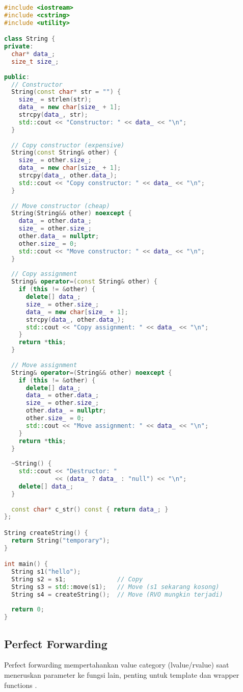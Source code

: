 \documentclass[../main.tex]{subfiles}
\begin{document}
\begin{lstlisting}[language=C++, caption={Implementasi move semantics}]
#include <iostream>
#include <cstring>
#include <utility>

class String {
private:
  char* data_;
  size_t size_;
  
public:
  // Constructor
  String(const char* str = "") {
    size_ = strlen(str);
    data_ = new char[size_ + 1];
    strcpy(data_, str);
    std::cout << "Constructor: " << data_ << "\n";
  }
  
  // Copy constructor (expensive)
  String(const String& other) {
    size_ = other.size_;
    data_ = new char[size_ + 1];
    strcpy(data_, other.data_);
    std::cout << "Copy constructor: " << data_ << "\n";
  }
  
  // Move constructor (cheap)
  String(String&& other) noexcept {
    data_ = other.data_;
    size_ = other.size_;
    other.data_ = nullptr;
    other.size_ = 0;
    std::cout << "Move constructor: " << data_ << "\n";
  }
  
  // Copy assignment
  String& operator=(const String& other) {
    if (this != &other) {
      delete[] data_;
      size_ = other.size_;
      data_ = new char[size_ + 1];
      strcpy(data_, other.data_);
      std::cout << "Copy assignment: " << data_ << "\n";
    }
    return *this;
  }
  
  // Move assignment
  String& operator=(String&& other) noexcept {
    if (this != &other) {
      delete[] data_;
      data_ = other.data_;
      size_ = other.size_;
      other.data_ = nullptr;
      other.size_ = 0;
      std::cout << "Move assignment: " << data_ << "\n";
    }
    return *this;
  }
  
  ~String() {
    std::cout << "Destructor: " 
              << (data_ ? data_ : "null") << "\n";
    delete[] data_;
  }
  
  const char* c_str() const { return data_; }
};

String createString() {
  return String("temporary");
}

int main() {
  String s1("hello");
  String s2 = s1;              // Copy
  String s3 = std::move(s1);   // Move (s1 sekarang kosong)
  String s4 = createString();  // Move (RVO mungkin terjadi)
  
  return 0;
}
\end{lstlisting}

\subsection{Perfect Forwarding}
Perfect forwarding mempertahankan value category (lvalue/rvalue) saat meneruskan parameter ke fungsi lain, penting untuk template dan wrapper functions \parencite{cpp-reference}.
\end{document}
